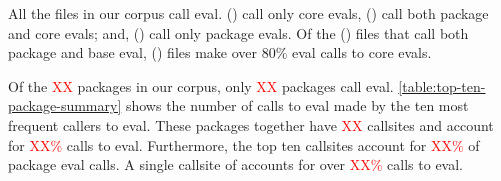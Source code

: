 \documentclass[conference]{IEEEtran}
\newcommand{\missingNumber}{\textcolor{red}{XX}\xspace}
\newcommand{\missingPercentage}{\textcolor{red}{XX\%}\xspace}
\begin{document}
\begin{table}[ht]
  \label{table:eval-count-summary}
  \caption{Distribution of eval calls and callsites in the corpus}
\end{table}

All the \TotalFileCount files in our corpus call eval. \CoreEvalFileCount
(\CoreEvalFilePerc) call only core evals, \AllEvalFileCount (\AllEvalFilePerc)
call both package and core evals; and, \PackageEvalFileCount
(\PackageEvalFilePerc) call only package evals. Of the \AllEvalFileCount
(\AllEvalFilePerc) files that call both package and base eval,
\EightyCoreEvalFilePerc (\EightyCoreEvalFileCount) files make over 80\% eval
calls to core evals.

Of the \missingNumber packages in our corpus, only \missingNumber packages call
eval. \ref{table:top-ten-package-summary} shows the number of calls to eval made
by the ten most frequent callers to eval. These packages together have
\missingNumber callsites and account for \missingPercentage calls to eval.
Furthermore, the top ten callsites account for \missingPercentage of package
eval calls. A single callsite of \TopTenPackageNameA accounts for over
\missingPercentage calls to eval.
\end{document}
